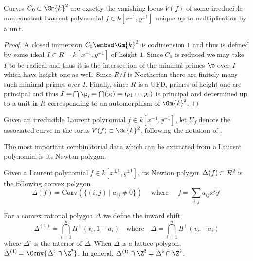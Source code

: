 \begin{prop}
Curves $C_0 \subset \Gm{k}^2$ are exactly the vanishing locus $V(f)$ of some irreducible non-constant Laurent polynomial $f \in k[x^{\pm 1}, y^{\pm 1}]$ unique up to multiplication by a unit.
\end{prop}

\begin{proof}
A closed immersion $C_0 \embed \Gm{k}^2$ is codimension $1$ and thus is defined by some ideal $I \subset R = k[x^{\pm 1}, y^{\pm 1}]$ of height $1$. Since $C_0$ is reduced we may take $I$ to be radical and thus it is the intersection of the minimal primes $\p$ over $I$ which have height one as well. Since $R/I$ is Noetherian there are finitely many such minimal primes over $I$. Finally, since $R$ is a UFD, primes of height one are principal and thus $I = \bigcap \p_i = \bigcap (p_i) = (p_1 \cdots p_r)$ is principal and determined up to a unit in $R$ corresponding to an automorphism of $\Gm{k}^2$.
\end{proof}
\noindent
\begin{defn}
Given an irreducible Laurent polynomial $f \in k[x^{\pm 1}, y^{\pm 1}]$, let $U_f$ denote the associated curve in the torus $V(f) \subset \Gm{k}^2$, following the notation of \cite{WC_preface}.
\end{defn} 


\noindent
The most important combinatorial data which can be extracted from a Laurent polynomial is its Newton polygon.


\begin{defn}
Given a Laurent polynomial $f \in k[x^{\pm 1}, y^{\pm 1}]$, its Newton polygon $\Delta(f) \subset \mathcal{R}^2$ is the following convex polygon,
\begin{equation}
\Delta(f) = \mathrm{Conv} \left( \{ (i,j) \mid a_{ij} \neq 0 \} \right) \quad \text{ where } \quad f = \sum_{i,j} a_{ij} x^i y^i 
\end{equation}
\end{defn}

\begin{defn}
For a convex rational polygon $\Delta$ we define the inward shift,
\[ \Delta^{(1)} = \bigcap_{i = 1}^n H^+(v_i, 1 - a_i) \quad \text{where} \quad \Delta = \bigcap_{i = 1}^n H^+(v_i, -a_i) \]
where $\Delta^\circ$ is the interior of $\Delta$. When $\Delta$ is a lattice polygon, $\Delta^{(1)} = \Conv{\Delta^\circ \cap \Z^2}$. In general, $\Delta^{(1)} \cap \Z^2 = \Delta^\circ \cap \Z^2$.
\end{defn}

